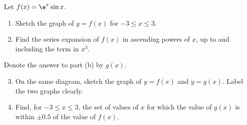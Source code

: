 \begin{problem}
    Let $f(x) = \e^x \sin x$.

    \begin{enumerate}
        \item Sketch the graph of $y = f(x)$ for $-3 \leq x \leq 3$.
        \item Find the series expansion of $f(x)$ in ascending powers of $x$, up to and including the term in $x^3$.
    \end{enumerate}

    Denote the answer to part (b) by $g(x)$.

    \begin{enumerate}
        \setcounter{enumi}{2}
        \item On the same diagram, sketch the graph of $y = f(x)$ and $y = g(x)$. Label the two graphs clearly.
        \item Find, for $-3 \leq x \leq 3$, the set of values of $x$ for which the value of $g(x)$ is within $\pm 0.5$ of the value of $f(x)$.
    \end{enumerate}
\end{problem}
\clearpage
